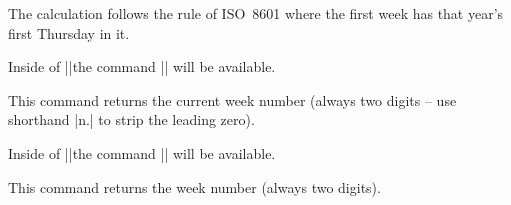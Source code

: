 \begin{multicols}{2}
\begin{command}{\pgfcalendarjulianyeartoweek{}}
  The calculation follows the rule of ISO~8601 where the first week has that
  year's first Thursday in it.
\end{command}

Inside of |\pgfcalendar|\indexCommandO\pgfcalendar the command |\pgfcalendarcurrentweek| will be available.
\begin{command}{\pgfcalendarcurrentweek}
  This command returns the current week number (always two digits -- use shorthand |n.|
  to strip the leading zero).
\end{command}

Inside of |\ifdate|\indexCommandO\ifdate the command |\pgfcalendarifdateweek| will be available.
\begin{command}{\pgfcalendarifdateweek}
  This command returns the week number (always two digits).
\end{command}
\end{multicols}